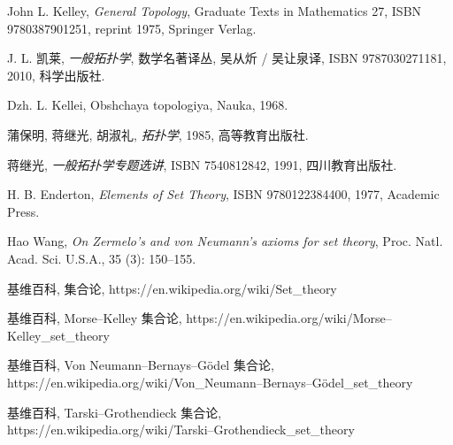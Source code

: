 \documentclass[zihao=-4,a4paper]{ctexart}
\begin{document}



\begin{thebibliography}{9}

John L. Kelley,  \emph{General Topology}, Graduate Texts in Mathematics 27, ISBN 9780387901251, reprint 1975, Springer Verlag.
	
J. L. 凯莱,  \emph{一般拓扑学}, 数学名著译丛, 吴从炘 / 吴让泉译, ISBN 9787030271181, 2010, 科学出版社.

{\selectfont  D{zh}. L. Kellei, Ob{shch}a{ya} topologi{ya}, Nauka,} 1968.


蒲保明, 蒋继光, 胡淑礼, \emph{拓扑学}, 1985, 高等教育出版社.

蒋继光, \emph{一般拓扑学专题选讲}, ISBN 7540812842, 1991, 四川教育出版社.
	
H. B. Enderton, \emph{Elements of Set Theory}, ISBN 9780122384400, 1977, Academic Press.
	
Hao Wang, \emph{On Zermelo's and von Neumann's axioms for set theory}, Proc. Natl. Acad. Sci. U.S.A., 35 (3): 150–155.

基维百科, 集合论,	https://en.wikipedia.org/wiki/Set\_theory

基维百科, Morse–Kelley 集合论,	https://en.wikipedia.org/wiki/Morse–Kelley\_set\_theory

基维百科, Von Neumann–Bernays–Gödel  集合论,\\ https://en.wikipedia.org/wiki/Von\_Neumann–Bernays–Gödel\_set\_theory

基维百科, Tarski–Grothendieck  集合论,\\
https://en.wikipedia.org/wiki/Tarski–Grothendieck\_set\_theory

\end{thebibliography}
\end{document}
